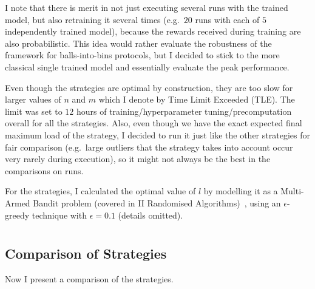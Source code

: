 I note that there is merit in not just executing several runs with the trained \DQL model, but also retraining it several times (e.g.\ $20$ runs with each of $5$ independently trained model), because the rewards received during training are also probabilistic. This idea would rather evaluate the robustness of the \DQL framework for balls-into-bins protocols, but I decided to stick to the more classical single trained model and essentially evaluate the peak performance.


Even though the \DP strategies are optimal by construction, they are too slow for larger values of $n$ and $m$ which I denote by Time Limit Exceeded (TLE). The limit was set to $12$ hours of training/hyperparameter tuning/precomputation overall for all the strategies. Also, even though we have the exact expected final maximum load of the \DP strategy, I decided to run it just like the other strategies for fair comparison (e.g.\ large outliers that the \DP strategy takes into account occur very rarely during execution), so it might not always be the best in the comparisons on \NumberofRuns runs.


For the \Threshold strategies, I calculated the optimal value of $l$ by modelling it as a Multi-Armed Bandit problem (covered in II Randomised Algorithms)~\cite{katehakis1987multiarmedbandit}, using an $\epsilon$-greedy technique with $\epsilon=0.1$ (details omitted).




\section{\TwoThinning}


\subsection{Comparison of Strategies}\label{two-thinning-comparison}

Now I present a comparison of the \TwoThinning strategies.


